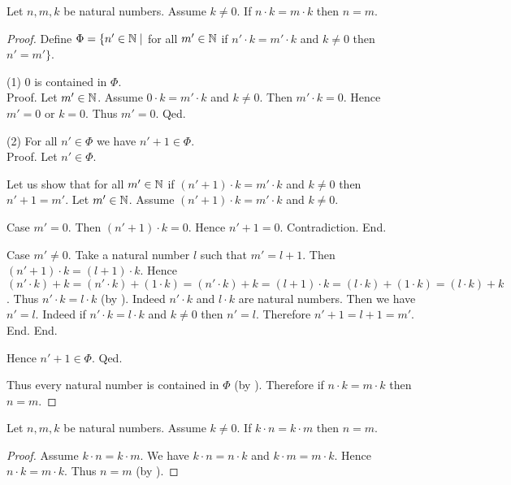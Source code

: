 \documentclass[10pt]{article}
\begin{document}
  \begin{forthel}
    \begin{proposition}[id=ARITHMETIC_06_31055184658432,printid]
      Let $n, m, k$ be natural numbers.
      Assume $k \neq 0$.
      If $n \cdot k = m \cdot k$ then $n = m$.
    \end{proposition}
    \begin{proof}
      Define $\Phi = \{ n' \in \mathbb{N} \mid$ for all $m' \in \mathbb{N}$ if $n' \cdot k = m' \cdot k$ and $k \neq 0$ then $n' = m' \}$.

      (1) $0$ is contained in $\Phi$. \\
      Proof.
        Let $m' \in \mathbb{N}$.
        Assume $0 \cdot k = m' \cdot k$ and $k \neq 0$.
        Then $m' \cdot k = 0$.
        Hence $m' = 0$ or $k = 0$.
        Thus $m' = 0$.
      Qed.

      (2) For all $n' \in \Phi$ we have $n' + 1 \in \Phi$. \\
      Proof.
        Let $n' \in \Phi$.

        Let us show that for all $m' \in \mathbb{N}$ if $(n' + 1) \cdot k = m' \cdot k$ and $k \neq 0$ then $n' + 1 = m'$.
          Let $m' \in \mathbb{N}$.
          Assume $(n' + 1) \cdot k = m' \cdot k$ and $k \neq 0$.

          Case $m' = 0$.
            Then $(n' + 1) \cdot k = 0$.
            Hence $n' + 1 = 0$.
            Contradiction.
          End.

          Case $m' \neq 0$.
            Take a natural number $l$ such that $m' = l + 1$.
            Then $(n' + 1) \cdot k = (l + 1) \cdot k$.
            Hence $(n' \cdot k) + k
              = (n' \cdot k) + (1 \cdot k)
              = (n' \cdot k) + k
              = (l + 1) \cdot k
              = (l \cdot k) + (1 \cdot k)
              = (l \cdot k) + k$.
            Thus $n' \cdot k = l \cdot k$ (by ).
            Indeed $n' \cdot k$ and $l \cdot k$ are natural numbers.
            Then we have $n' = l$.
            Indeed if $n' \cdot k = l \cdot k$ and $k \neq 0$ then $n' = l$.
            Therefore $n' + 1 = l + 1 = m'$.
          End.
        End.

        Hence $n' + 1 \in \Phi$.
      Qed.

      Thus every natural number is contained in $\Phi$ (by ).
      Therefore if $n \cdot k = m \cdot k$ then $n = m$.
    \end{proof}
  \end{forthel}

  \begin{forthel}
    \begin{corollary}[id=ARITHMETIC_06_8575191374364672,printid]
      Let $n, m, k$ be natural numbers.
      Assume $k \neq 0$.
      If $k \cdot n = k \cdot m$ then $n = m$.
    \end{corollary}
    \begin{proof}
      Assume $k \cdot n = k \cdot m$.
      We have $k \cdot n = n \cdot k$ and $k \cdot m = m \cdot k$.
      Hence $n \cdot k = m \cdot k$.
      Thus $n = m$ (by ).
    \end{proof}
  \end{forthel}
\end{document}
